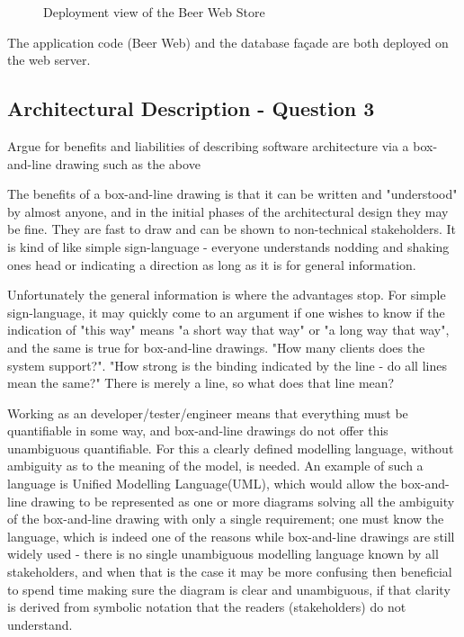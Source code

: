 \begin{figure}[!htb]
\centerline{}
\caption{Deployment view of the Beer Web Store}
\label{fig:ad_allocation}
\end{figure}

The application code (Beer Web) and the database fa\c cade are
both deployed on the web server.

\subsection{Architectural Description - Question 3}

\begin{question}
Argue for benefits and liabilities of describing software
architecture via a box-and-line drawing such as the above
\end{question}

The benefits of a box-and-line drawing is that it can be written and "understood" by almost anyone, and in the initial phases of the architectural design they may be fine. They are fast to draw and can be shown to non-technical stakeholders. It is kind of like simple sign-language - everyone understands nodding and shaking ones head or indicating a direction as long as it is for general information.

Unfortunately the general information is where the advantages stop. For simple sign-language, it may quickly come to an argument if one wishes to know if the indication of "this way" means "a short way that way" or "a long way that way", and the same is true for box-and-line drawings. "How many clients does the system support?". "How strong is the binding indicated by the line - do all lines mean the same?" There is merely a line, so what does that line mean?

Working as an developer/tester/engineer means that everything must be quantifiable in some way, and box-and-line drawings do not offer this unambiguous quantifiable. For this a clearly defined modelling language, without ambiguity as to the meaning of the model, is needed. An example of such a language is Unified Modelling Language(UML), which would allow the box-and-line drawing to be represented as one or more diagrams solving all the ambiguity of the box-and-line drawing with only a single requirement; one must know the language, which is indeed one of the reasons while box-and-line drawings are still widely used - there is no single unambiguous modelling language known by all stakeholders, and when that is the case it may be more confusing then beneficial to spend time making sure the diagram is clear and unambiguous, if that clarity is derived from symbolic notation that the readers (stakeholders) do not understand.

